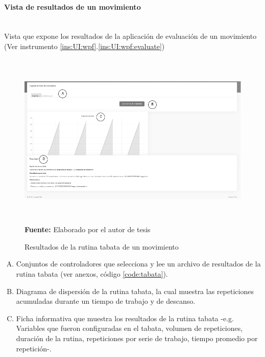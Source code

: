 \paragraph{Vista de resultados de un movimiento}\mbox{} \\ \label{ins:UI:web:result}
Vista que expone los resultados de la aplicaci\'on de evaluaci\'on de un movimiento (Ver instrumento \ref{ins:UI:wpf}.\ref{ins:UI:wpf:evaluate})
\begin{figure}[H]
	\caption{Resultados de la rutina tabata de un movimiento}
	\label{fig:resultsTabata}
	\centering
	\includegraphics[width=460px,height=320px]{graphics/web-results.PNG} \\
	\textbf{Fuente:} Elaborado por el autor de tesis
\end{figure}
\begin{enumerate}[A.]
\item Conjuntos de controladores que selecciona y lee un archivo de resultados de la rutina tabata (ver anexos, c\'odigo \ref{code:tabata}).
\item Diagrama de dispersi\'on de la rutina tabata, la cual muestra las repeticiones acumuladas durante un tiempo de trabajo y de descanso.
\item Ficha informativa que muestra los resultados de la rutina tabata -e.g. Variables que fueron configuradas en el tabata, volumen de repeticiones, duraci\'on de la rutina, repeticiones por serie de trabajo, tiempo promedio por repetici\'on-.
\end{enumerate}
